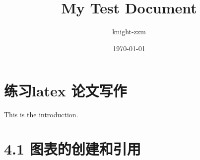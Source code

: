 \documentclass[a4paper,12pt]{article}
\begin{document}
\title{My Test Document}
\author{knight-zzm}
\date{\today}
\maketitle
\new
\section{练习latex 论文写作}
This is the introduction.

\section{4.1 图表的创建和引用}
\end{document}
